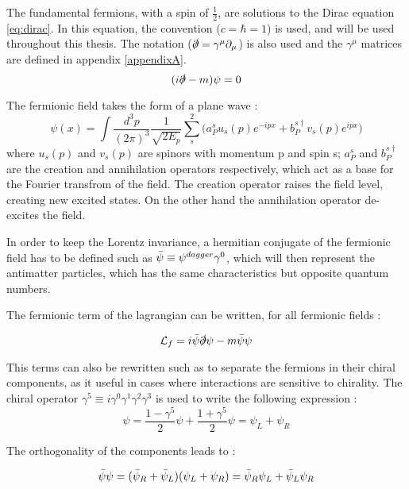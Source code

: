 The fundamental fermions, with a spin of $\frac{1}{2}$, are solutions to the Dirac equation \ref{eq:dirac}. In this equation, the convention ($c = \hbar = 1$) is used, and will be used throughout this thesis. The notation ($\slashed{\partial} = \gamma^{\mu}\partial_{\mu}$) is also used and the $\gamma^{\mu}$ matrices are defined in appendix \ref{appendixA}.
\begin{equation}
    (i\slashed{\partial} - m)\psi = 0
    \label{eq:dirac}
\end{equation}

The fermionic field takes the form of a plane wave :
\begin{equation}
    \psi(x) = \int \frac{d^3 p}{(2\pi)^3} \frac{1}{\sqrt{2E_p}} \sum^{2}_{s} \Big( a^{s}_{P} u_s (p)e^{-ipx} + b^{s\dagger}_P v_s (p)e^{ipx} \Big)
\end{equation}
where $u_s (p)$ and $v_s (p)$ are spinors with momentum p and spin s; $a^{s}_P$ and $b^{s\dagger}_P$ are the creation and annihilation operators respectively, which act as a base for the Fourier transfrom of the field. The creation operator raises the field level, creating new excited states. On the other hand the annihilation operator de-excites the field.

In order to keep the Lorentz invariance, a hermitian conjugate of the fermionic field has to be defined such as $\Bar{\psi} \equiv \psi^{dagger}\gamma^0$, which will then represent the antimatter particles, which has the same characteristics but opposite quantum numbers.\newline

The fermionic term of the lagrangian can be written, for all fermionic fields :

\begin{equation}
    \mathcal{L}_f = i\Bar{\psi}\slashed{\partial}\psi - m\Bar{\psi}\psi
\end{equation}

This terms can also be rewritten such as to separate the fermions in their chiral components, as it useful in cases where interactions are sensitive to chirality. The chiral operator $\gamma^5 \equiv i\gamma^0 \gamma^1 \gamma^2 \gamma^3$ is used to write the following expression :
\begin{equation}
    \psi = \frac{1- \gamma^5}{2}\psi + \frac{1+ \gamma^5}{2}\psi = \psi_L + \psi_R
\end{equation}

The orthogonality of the components leads to :

\begin{equation}
    \Bar{\psi}\psi = (\Bar{\psi}_R + \Bar{\psi}_L)(\psi_L + \psi_R) = \Bar{\psi}_R \psi_L + \Bar{\psi}_L \psi_R
    \label{eq:chiral_fermions}
\end{equation}

